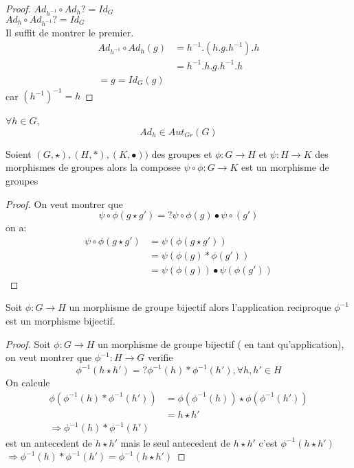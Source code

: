 \documentclass[../main.tex]{subfiles}
\begin{document}
\begin{proof}
$Ad_{h^{-1}} \circ Ad_h  ?= Id_G$\\
$ Ad_h \circ Ad_{h^{-1}}  ?= Id_G$\\
Il suffit de montrer le premier.
\begin{align*}
	Ad_{h^{-1}} \circ Ad_h(g) &= h^{-1}.(h.g.h^{-1}).h\\
&= h^{-1}.h.g.h^{-1}.h\\
=g = Id_G(g)
\end{align*}
car $ ( h^{-1}) ^{-1}=h$
\end{proof}
$\forall h \in G$, 
\[ 
	Ad_h \in Aut_{Gr} ( G)
\]
\begin{propo}
	Soient $(G,\star), ( H,\ast), ( K,\bullet ))$ des groupes et $\phi:G\to H$ et $\psi: H\to K$ des morphismes de groupes alors la composee $\psi \circ \phi: G\to K$ est un morphisme de groupes
\end{propo}
\begin{proof}
On veut montrer que 
\[ 
	\psi \circ \phi ( g \star g') =? \psi \circ \phi(g) \bullet \psi \circ(g')
\]
on a:
\begin{align*}
	\psi \circ \phi(g\star g') &= \psi ( \phi(g\star g'))\\
				   &= \psi ( \phi(g) \ast \phi(g'))\\
				   &=\psi(\phi(g)) \bullet \psi(\phi(g'))
\end{align*}

\end{proof}
\begin{propo}
Soit $\phi: G \to H$ un morphisme de groupe bijectif alors l'application reciproque $\phi^{-1}$ est un morphisme bijectif.
\end{propo}
\begin{proof}
	Soit $\phi: G \to H$ un morphisme de groupe bijectif ( en tant qu'application), on veut montrer que $\phi^{-1}:H \to G$ verifie
	\[ 
		\phi^{-1}(h\star h') =? \phi^{-1}(h) \ast \phi^{-1}(h'), \forall h,h' \in H
	\]
	On calcule
	\begin{align*}
		\phi ( \phi^{-1}(h) \ast \phi^{-1}(h')) &= \phi(\phi^{-1}(h)) \star \phi(\phi^{-1}(h'))\\
							&= h \star h'\\
							\Rightarrow \phi^{-1}(h) \ast \phi^{-1}(h')
	\end{align*}
	est un antecedent de $h\star h'$ mais le seul antecedent de  $h\star h'$ c'est $\phi^{-1}(h\star h')$\\
	$\Rightarrow \phi^{-1}(h) \ast \phi^{-1}(h') = \phi^{-1}(h\star h')$ 
	
	

\end{proof}
\end{document}
